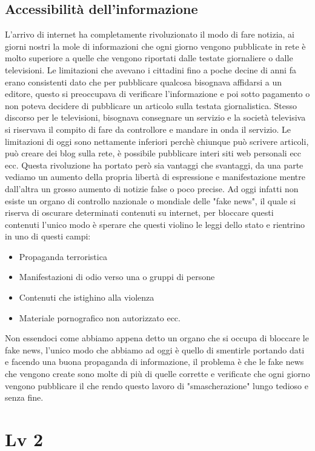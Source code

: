 \documentclass{article}
\begin{document}
\subsection{Accessibilità dell'informazione}
L'arrivo di internet ha completamente rivoluzionato il modo di fare notizia, ai giorni nostri la mole di informazioni che ogni giorno vengono pubblicate in rete è molto superiore a quelle che vengono riportati dalle testate giornaliere o dalle televisioni.
Le limitazioni che avevano i cittadini fino a poche decine di anni fa erano consistenti dato che per pubblicare qualcosa bisognava affidarsi a un editore, questo si preoccupava di verificare l'informazione e poi sotto pagamento o non poteva decidere di pubblicare un articolo sulla testata giornalistica. Stesso discorso per le televisioni, bisognava consegnare un servizio e la società televisiva si riservava il compito di fare da controllore e mandare in onda il servizio.
Le limitazioni di oggi sono nettamente inferiori perchè chiunque può scrivere articoli, può creare dei blog sulla rete, è possibile pubblicare interi siti web personali ecc ecc.
Questa rivoluzione ha portato però sia vantaggi che svantaggi, da una parte vediamo un aumento della propria libertà di espressione e manifestazione mentre dall'altra un grosso aumento di notizie false o poco precise.
Ad oggi infatti non esiste un organo di controllo nazionale o mondiale delle "fake news", il quale si riserva di oscurare determinati contenuti su internet, per bloccare questi contenuti l'unico modo è sperare che questi violino le leggi dello stato e rientrino in uno di questi campi:
\begin{itemize}
    \item Propaganda terroristica
    \item Manifestazioni di odio verso una o gruppi di persone
    \item Contenuti che istighino alla violenza
    \item Materiale pornografico non autorizzato ecc.
\end{itemize}
Non essendoci come abbiamo appena detto un organo che si occupa di bloccare le fake news, l'unico modo che abbiamo ad oggi è quello di smentirle portando dati e facendo una buona propaganda di informazione, il problema è che le fake news che vengono create sono molte di più di quelle corrette e verificate che ogni giorno vengono pubblicare il che rendo questo lavoro di "smascherazione" lungo tedioso e senza fine.
\section{Lv 2}
\end{document}
